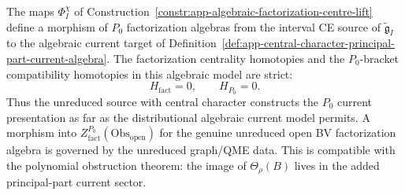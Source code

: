 \begin{thm}
\label{thm:app-algebraic-factorization-centre-zero-homotopies}
  The maps \(\Phi_I^\chi\) of
  Construction~\ref{constr:app-algebraic-factorization-centre-lift}
  define a morphism of \(P_0\) factorization algebras from the
  interval CE source of \(\widetilde{\mathfrak g}_I\) to the
  algebraic current target of
  Definition~\ref{def:app-central-character-principal-part-current-algebra}.
  The factorization centrality homotopies and the \(P_0\)-bracket
  compatibility homotopies in this algebraic model are strict:
  \[
    H_{\mathrm{fact}}=0,\qquad H_{P_0}=0 .
  \]
  Thus the unreduced source with central character constructs the
  \(P_0\) current presentation as far as the distributional algebraic
  current model permits.  A morphism into
  \(Z^{P_0}_{\mathrm{fact}}(\mathrm{Obs}_{\mathrm{open}})\) for the
  genuine unreduced open BV factorization algebra is governed by the
  unreduced graph/QME data.  This is compatible with the polynomial obstruction
  theorem: the image of \(\Theta_\rho(B)\) lives in the added
  principal-part current sector.
\end{thm}

